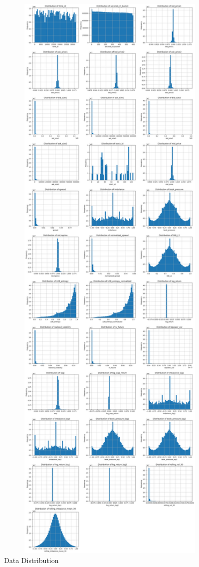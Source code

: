 \documentclass[
  letterpaper,
  DIV=11,
  numbers=noendperiod]{scrartcl}
\begin{document}
\begin{figure}[H]

{\centering \includegraphics[width=1\textwidth,height=\textheight]{FinalDF-Hist.png}

}

\caption{Data Distribution}

\end{figure}%
\end{document}
